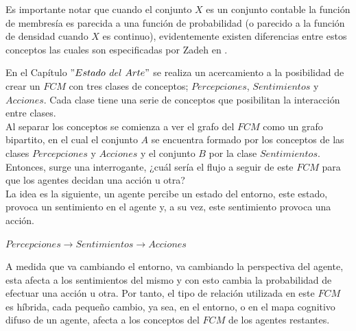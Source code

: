 Es importante notar que cuando el conjunto $X$ es un conjunto contable la función de membresía es parecida a una 
función de probabilidad (o parecido a la función de densidad cuando $X$ es continuo), evidentemente existen
diferencias entre estos conceptos las cuales son especificadas por Zadeh en \autocite{Zadeh1965}.


En el Capítulo $"Estado$ $del$ $Arte"$ se realiza un acercamiento a la posibilidad de crear un $FCM$ con tres clases de 
conceptos; $Percepciones$, $Sentimientos$ y $Acciones$. Cada clase tiene una serie de conceptos que posibilitan la 
interacción entre clases.\\
Al separar los conceptos se comienza a ver el grafo del $FCM$ como un grafo bipartito, en el cual el conjunto $A$
se encuentra formado por los conceptos de las clases $Percepciones$ y $Acciones$ y el conjunto $B$ por la clase
$Sentimientos$. Entonces, surge una interrogante, ¿cuál sería el flujo a seguir de este $FCM$ para que los agentes
decidan una acción u otra?\\
La idea es la siguiente, un agente percibe un estado del entorno, este estado, provoca un sentimiento en el agente
y, a su vez, este sentimiento provoca una acción.
\begin{center}
    $Percepciones \rightarrow Sentimientos \rightarrow Acciones$\\
\end{center}

A medida que va cambiando el entorno, va cambiando la perspectiva del agente, esta afecta a los sentimientos del mismo 
y con esto cambia la probabilidad de efectuar una acción u otra. Por tanto, el tipo de relación utilizada en este $FCM$
es híbrida, cada pequeño cambio, ya sea, en el entorno, o en el mapa cognitivo difuso de un agente, afecta a los conceptos
del $FCM$ de los agentes restantes.

